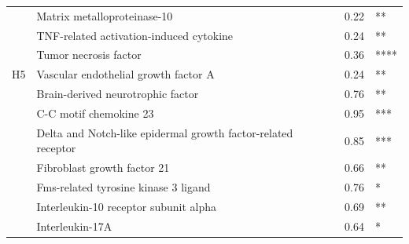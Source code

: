 \begin{table}[ht]
{\begin{tabular}{clll}
                                           & Matrix metalloproteinase-10                                                 & 0.22                               & **                                      \\
                                           & \cellcolor[HTML]{EFEFEF}TNF-related activation-induced cytokine             & \cellcolor[HTML]{EFEFEF}0.24       & \cellcolor[HTML]{EFEFEF}**              \\
                                           & \cellcolor[HTML]{EFEFEF}Tumor necrosis factor                               & \cellcolor[HTML]{EFEFEF}0.36       & \cellcolor[HTML]{EFEFEF}****            \\
\multirow{-11}{*}{H5}                      & \cellcolor[HTML]{EFEFEF}Vascular endothelial growth factor A                & \cellcolor[HTML]{EFEFEF}0.24       & \cellcolor[HTML]{EFEFEF}**              \\ \hline
                                           & \cellcolor[HTML]{EFEFEF}Brain-derived neurotrophic factor                   & \cellcolor[HTML]{EFEFEF}0.76       & \cellcolor[HTML]{EFEFEF}**              \\
                                           & C-C motif chemokine 23                                                      & 0.95                               & ***                                     \\
                                           & Delta and Notch-like epidermal growth factor-related receptor               & 0.85                               & ***                                     \\
                                           & Fibroblast growth factor 21                                                 & 0.66                               & **                                      \\
                                           & Fms-related tyrosine kinase 3 ligand                                        & 0.76                               & *                                       \\
                                           & \cellcolor[HTML]{EFEFEF}Interleukin-10 receptor subunit alpha               & \cellcolor[HTML]{EFEFEF}0.69       & \cellcolor[HTML]{EFEFEF}**              \\
                                           & \cellcolor[HTML]{EFEFEF}Interleukin-17A                                     & \cellcolor[HTML]{EFEFEF}0.64       & \cellcolor[HTML]{EFEFEF}*               \\

\end{tabular}}
\end{table}
